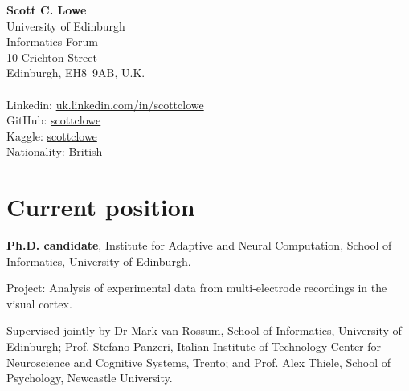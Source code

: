 \documentclass[11pt, a4paper]{article} %
\newcommand{\withindent}{\setlength\parindent{15pt}}
\begin{document}
%
%
\textbf{\LARGE Scott C. Lowe}\\[1cm] %
%
University of Edinburgh\\
Informatics Forum\\
10 Crichton Street\\
Edinburgh, {EH8~9AB}, U.K.
%
\\[.2cm]
%
%
\\[.2cm]
%
Linkedin: \href{https://uk.linkedin.com/in/scottclowe}{uk.linkedin.com/in/scottclowe}\\
GitHub: \href{https://github.com/scottclowe}{scottclowe}\\
Kaggle: \href{https://www.kaggle.com/scottclowe}{scottclowe}\\
%
%

Nationality: British %
%
\\%


\section*{Current position}

\textbf{Ph.D. candidate}, Institute for Adaptive and Neural Computation, School of Informatics, University of Edinburgh.

\withindent%
Project: Analysis of experimental data from multi-electrode recordings in the visual cortex.

\withindent%
Supervised jointly by Dr Mark van Rossum, School of Informatics, University of Edinburgh; Prof. Stefano Panzeri, Italian Institute of Technology Center for Neuroscience and Cognitive Systems, Trento; and Prof. Alex Thiele, School of Psychology, Newcastle University.
\end{document}
